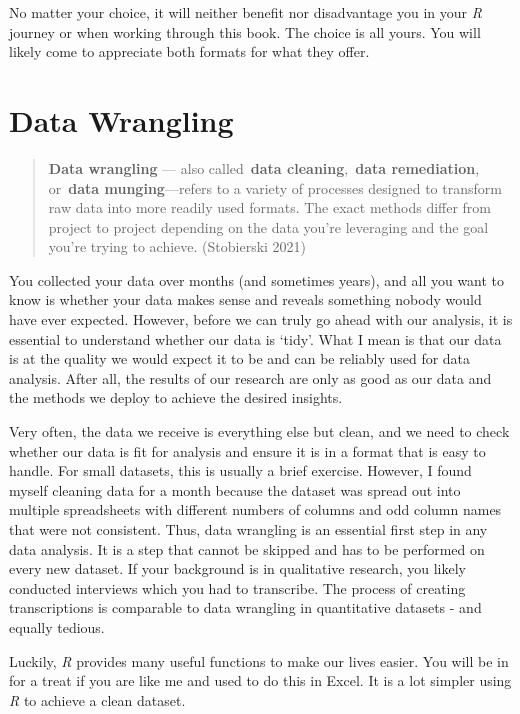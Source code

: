 \documentclass[
  letterpaper,
  DIV=11,
  numbers=noendperiod]{scrreprt}
\begin{document}
No matter your choice, it will neither benefit nor disadvantage you in
your \emph{R} journey or when working through this book. The choice is
all yours. You will likely come to appreciate both formats for what they
offer.


\chapter{Data Wrangling}\label{sec-data-wrangling}

\begin{quote}
\textbf{Data wrangling} --- also called~\textbf{data
cleaning},~\textbf{data remediation}, or~\textbf{data munging}---refers
to a variety of processes designed to transform raw data into more
readily used formats. The exact methods differ from project to project
depending on the data you're leveraging and the goal you're trying to
achieve. (Stobierski 2021)
\end{quote}

You collected your data over months (and sometimes years), and all you
want to know is whether your data makes sense and reveals something
nobody would have ever expected. However, before we can truly go ahead
with our analysis, it is essential to understand whether our data is
`tidy'. What I mean is that our data is at the quality we would expect
it to be and can be reliably used for data analysis. After all, the
results of our research are only as good as our data and the methods we
deploy to achieve the desired insights.

Very often, the data we receive is everything else but clean, and we
need to check whether our data is fit for analysis and ensure it is in a
format that is easy to handle. For small datasets, this is usually a
brief exercise. However, I found myself cleaning data for a month
because the dataset was spread out into multiple spreadsheets with
different numbers of columns and odd column names that were not
consistent. Thus, data wrangling is an essential first step in any data
analysis. It is a step that cannot be skipped and has to be performed on
every new dataset. If your background is in qualitative research, you
likely conducted interviews which you had to transcribe. The process of
creating transcriptions is comparable to data wrangling in quantitative
datasets - and equally tedious.

Luckily, \emph{R} provides many useful functions to make our lives
easier. You will be in for a treat if you are like me and used to do
this in Excel. It is a lot simpler using \emph{R} to achieve a clean
dataset.
\end{document}
